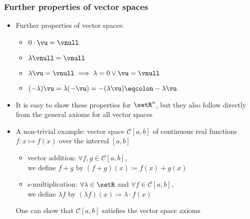 \begin{frame}
  \frametitle{Further properties of vector spaces}

  \begin{itemize}
  \item Further properties of vector spaces:
    \begin{itemize}
    \item $0\cdot \vu = \vnull$
    \item $\lambda \vnull = \vnull$
    \item $\lambda \vu = \vnull \implies \lambda = 0 \vee \vu = \vnull$
    \item $(-\lambda)\vu = \lambda(-\vu) = -(\lambda \vu) \eqcolon -\lambda \vu$
    \end{itemize}
    \pause
  \item It is easy to show these properties for $\setR^n$, but they also
    follow directly from the general axioms for all vector spaces%
    \pause\gap
  \item A non-trivial example: vector space $\mathcal{C}[a,b]$ of continuous
    real functions $f: x\mapsto f(x)$ over the interval $[a,b]$
    \begin{itemize}
    \item vector addition: $\forall f,g \in \mathcal{C}[a,b]$,\\
      we define $f+g$ by $(f+g)(x) \coloneq f(x) + g(x)$
    \item s-multiplication: $\forall \lambda\in \setR$ and $\forall f \in
      \mathcal{C}[a,b]$,\\
      we define $\lambda f$ by $(\lambda f)(x) \coloneq \lambda\cdot f(x)$
    \end{itemize}
  \itemhand One can show that $\mathcal{C}[a,b]$ satisfies the vector space axioms
  \end{itemize}
\end{frame}


